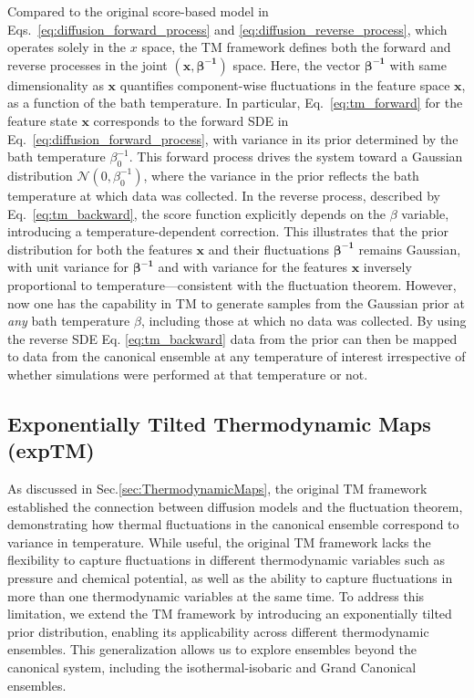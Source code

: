 \documentclass[aip,jcp,reprint,longbibliography]{revtex4-1}
\begin{document}
Compared to the original score-based model in Eqs.~\ref{eq:diffusion_forward_process} and \ref{eq:diffusion_reverse_process}, which operates solely in the $x$ space, the TM framework defines both the forward and reverse processes in the joint $(\mathbf{x},\boldsymbol{\beta^{-1}})$ space. Here, the vector $\boldsymbol{\beta^{-1}}$ with same dimensionality as $\mathbf{x}$ quantifies component-wise fluctuations in
the feature space $\mathbf{x}$, as a function of the bath temperature. In particular, Eq.~\ref{eq:tm_forward} for the feature state $\mathbf{x}$ corresponds to the forward SDE in Eq.~\ref{eq:diffusion_forward_process}, with variance in its prior determined by the bath temperature $\beta_{0}^{-1}$. This forward process drives the system toward a Gaussian distribution $\mathcal{N}(0,\beta_0^{-1})$, where the variance in the prior reflects the bath temperature at which data was collected. In the reverse process, described by Eq.~\ref{eq:tm_backward}, the score function explicitly depends on the $\beta$ variable, introducing a temperature-dependent correction.  This illustrates that the prior distribution for both the features $\mathbf{x}$ and their fluctuations $\boldsymbol{\beta^{-1}}$ remains Gaussian, with unit variance for $\boldsymbol{\beta^{-1}}$ and with variance for the features $\mathbf{x}$ inversely proportional to temperature—consistent with the fluctuation theorem. However, now one has the capability in TM to generate samples from the Gaussian prior at \textit{any} bath temperature $\beta$, including those at which no data was collected. By using the reverse SDE Eq. \ref{eq:tm_backward} data from the prior can then be mapped to data from the canonical ensemble at any temperature of interest irrespective of whether simulations were performed at that temperature or not.

\subsection{Exponentially Tilted Thermodynamic Maps (expTM)}
\label{sec:expTM}
As discussed in Sec.\ref{sec:ThermodynamicMaps}, the original TM framework\cite{herron2024inferring} established the connection between diffusion models and the fluctuation theorem, demonstrating how thermal fluctuations in the canonical ensemble correspond to variance in temperature. While useful, the original TM framework lacks the flexibility to capture fluctuations in different thermodynamic variables such as pressure and chemical potential, as well as the ability to capture fluctuations in more than one thermodynamic variables at the same time. To address this limitation, we extend the TM framework by introducing an exponentially tilted prior distribution, enabling its applicability across different thermodynamic ensembles. This generalization allows us to explore ensembles beyond the canonical system, including the isothermal-isobaric and Grand Canonical ensembles. 
\end{document}
